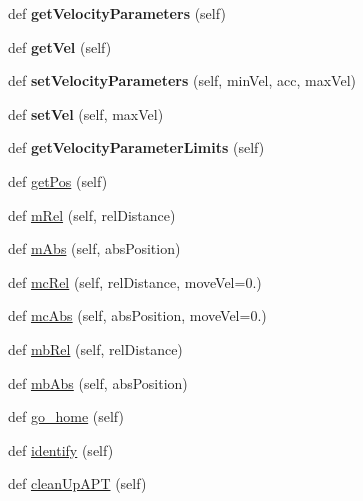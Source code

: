 \begin{DoxyCompactItemize}
\item 
def {\bfseries get\+Velocity\+Parameters} (self)\hypertarget{class_py_a_p_t_1_1_a_p_t_motor_a7150ab8cb1af311e8fa19994094711ab}{}\label{class_py_a_p_t_1_1_a_p_t_motor_a7150ab8cb1af311e8fa19994094711ab}

\item 
def {\bfseries get\+Vel} (self)\hypertarget{class_py_a_p_t_1_1_a_p_t_motor_a3443ec77ac7e5dacd4e7ec96dd0d40f8}{}\label{class_py_a_p_t_1_1_a_p_t_motor_a3443ec77ac7e5dacd4e7ec96dd0d40f8}

\item 
def {\bfseries set\+Velocity\+Parameters} (self, min\+Vel, acc, max\+Vel)\hypertarget{class_py_a_p_t_1_1_a_p_t_motor_a1b0731752d870e3229460f74fa127951}{}\label{class_py_a_p_t_1_1_a_p_t_motor_a1b0731752d870e3229460f74fa127951}

\item 
def {\bfseries set\+Vel} (self, max\+Vel)\hypertarget{class_py_a_p_t_1_1_a_p_t_motor_a69de4521d6f007d4fd95296d2348b0af}{}\label{class_py_a_p_t_1_1_a_p_t_motor_a69de4521d6f007d4fd95296d2348b0af}

\item 
def {\bfseries get\+Velocity\+Parameter\+Limits} (self)\hypertarget{class_py_a_p_t_1_1_a_p_t_motor_afb3157681780d84eb92dbbed84ce43da}{}\label{class_py_a_p_t_1_1_a_p_t_motor_afb3157681780d84eb92dbbed84ce43da}

\item 
def \hyperlink{class_py_a_p_t_1_1_a_p_t_motor_ab046cf4fbb30aa5f64fa52816403c336}{get\+Pos} (self)
\item 
def \hyperlink{class_py_a_p_t_1_1_a_p_t_motor_a2c49c2398f67748bf0637e3a51616a62}{m\+Rel} (self, rel\+Distance)
\item 
def \hyperlink{class_py_a_p_t_1_1_a_p_t_motor_ae1966470f1a45d71afd6dd86f45e3313}{m\+Abs} (self, abs\+Position)
\item 
def \hyperlink{class_py_a_p_t_1_1_a_p_t_motor_a0b638df0f5cd8a8444cd03e21982148d}{mc\+Rel} (self, rel\+Distance, move\+Vel=0.)
\item 
def \hyperlink{class_py_a_p_t_1_1_a_p_t_motor_a6212cc0f3fc5987c39dba2b0cbaae333}{mc\+Abs} (self, abs\+Position, move\+Vel=0.)
\item 
def \hyperlink{class_py_a_p_t_1_1_a_p_t_motor_a8b6943664252d6f8065a80e88e8d8f3a}{mb\+Rel} (self, rel\+Distance)
\item 
def \hyperlink{class_py_a_p_t_1_1_a_p_t_motor_a3ba7ffc1e437e613915014761a845bfd}{mb\+Abs} (self, abs\+Position)
\item 
def \hyperlink{class_py_a_p_t_1_1_a_p_t_motor_ae061d9bafdf6086daadd0eae086b1047}{go\+\_\+home} (self)
\item 
def \hyperlink{class_py_a_p_t_1_1_a_p_t_motor_a8e9dbb1f93c971ab608b37eea46afcc2}{identify} (self)
\item 
def \hyperlink{class_py_a_p_t_1_1_a_p_t_motor_ae818c435bb6338949d04754d800a3d63}{clean\+Up\+A\+PT} (self)
\end{DoxyCompactItemize}
